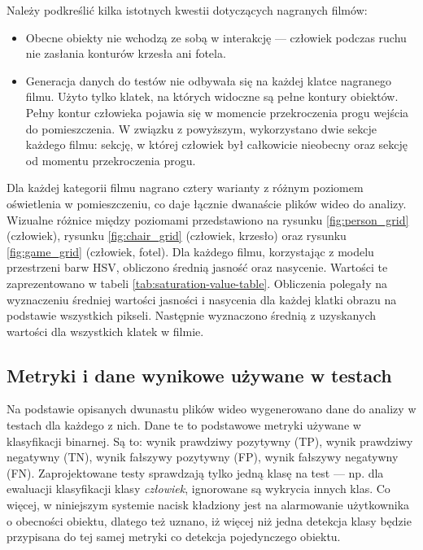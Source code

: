 Należy podkreślić kilka istotnych kwestii dotyczących nagranych filmów:
\begin{itemize}
    \item Obecne obiekty nie wchodzą ze sobą w interakcję --- człowiek podczas ruchu nie zasłania konturów krzesła ani fotela.
    \item Generacja danych do testów nie odbywała się na każdej klatce nagranego filmu. Użyto tylko klatek, na których widoczne są pełne kontury obiektów. Pełny kontur człowieka pojawia się w momencie przekroczenia progu wejścia do pomieszczenia. W związku z powyższym, wykorzystano dwie sekcje każdego filmu: sekcję, w której człowiek był całkowicie nieobecny oraz sekcję od momentu przekroczenia progu.
\end{itemize}

Dla każdej kategorii filmu nagrano cztery warianty z różnym poziomem oświetlenia w pomieszczeniu, co daje łącznie dwanaście plików wideo do analizy. Wizualne różnice między poziomami przedstawiono na rysunku \ref{fig:person_grid} (człowiek), rysunku \ref{fig:chair_grid} (człowiek, krzesło) oraz rysunku \ref{fig:game_grid} (człowiek, fotel). 
Dla każdego filmu, korzystając z modelu przestrzeni barw HSV, obliczono średnią jasność oraz nasycenie. Wartości te zaprezentowano w tabeli \ref{tab:saturation-value-table}. Obliczenia polegały na wyznaczeniu średniej wartości jasności i nasycenia dla każdej klatki obrazu na podstawie wszystkich pikseli. Następnie wyznaczono średnią z uzyskanych wartości dla wszystkich klatek w filmie.











\subsection{Metryki i dane wynikowe używane w testach}
Na podstawie opisanych dwunastu plików wideo wygenerowano dane do analizy w testach dla każdego z nich. Dane te to podstawowe metryki używane w klasyfikacji binarnej. Są to: wynik prawdziwy pozytywny (TP), wynik prawdziwy negatywny (TN), wynik fałszywy pozytywny (FP), wynik fałszywy negatywny (FN). 
Zaprojektowane testy sprawdzają tylko jedną klasę na test --- np. dla ewaluacji klasyfikacji klasy \emph{człowiek}, ignorowane są wykrycia innych klas. Co więcej, w niniejszym systemie nacisk kładziony jest na alarmowanie użytkownika o obecności obiektu, dlatego też uznano, iż więcej niż jedna detekcja klasy będzie przypisana do tej samej metryki co detekcja pojedynczego obiektu. 

